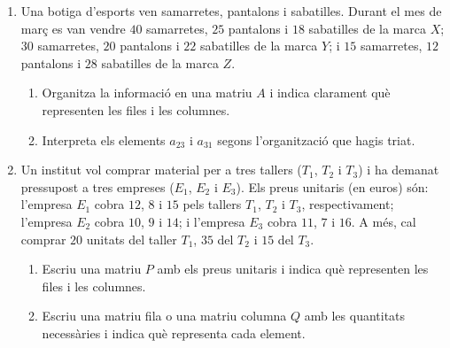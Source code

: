 \documentclass[12pt,a4paper]{article}
\newcommand{\blocInici}{%
  \par\nobreak\vspace{0pt}%
  \begin{minipage}[t]{\linewidth}%
}
\newcommand{\blocFi}{%
  \end{minipage}%
  \par
}
\begin{document}
\begin{enumerate}[leftmargin=*,itemsep=0.55em,parsep=0.2em]
\item
{}%
\blocInici
Una botiga d'esports ven samarretes, pantalons i sabatilles.
Durant el mes de març es van vendre $40$ samarretes, $25$ pantalons i $18$ sabatilles de la marca $X$;
$30$ samarretes, $20$ pantalons i $22$ sabatilles de la marca $Y$;
i $15$ samarretes, $12$ pantalons i $28$ sabatilles de la marca $Z$.
\begin{enumerate}[label=\alph*),leftmargin=1.4em,itemsep=0.25em]
  \item Organitza la informació en una matriu $A$ i indica clarament
    què representen les files i les columnes.
  \item Interpreta els elements $a_{23}$ i $a_{31}$ segons l'organització que hagis triat.
\end{enumerate}
\blocFi

\item
{}%
\blocInici
Un institut vol comprar material per a tres tallers ($T_1$, $T_2$ i $T_3$)
i ha demanat pressupost a tres empreses ($E_1$, $E_2$ i $E_3$).
Els preus unitaris (en euros) són:
l'empresa $E_1$ cobra $12$, $8$ i $15$ pels tallers $T_1$, $T_2$ i $T_3$, respectivament;
l'empresa $E_2$ cobra $10$, $9$ i $14$;
i l'empresa $E_3$ cobra $11$, $7$ i $16$.
A més, cal comprar $20$ unitats del taller $T_1$, $35$ del $T_2$ i $15$ del $T_3$.
\begin{enumerate}[label=\alph*),leftmargin=1.4em,itemsep=0.25em]
  \item Escriu una matriu $P$ amb els preus unitaris
    i indica què representen les files i les columnes.
  \item Escriu una matriu fila o una matriu columna $Q$ amb les quantitats necessàries
    i indica què representa cada element.
\end{enumerate}
\blocFi


\end{enumerate}
\end{document}
